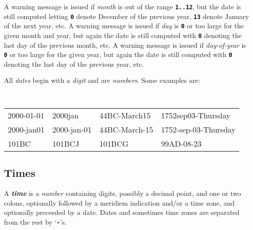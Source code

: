 \documentclass[12pt]{article}
\newcommand{\TT}[1]{{\tt \bfseries #1}}
\newcommand{\key}[1]{{\bf \em #1}\index{#1}}
\newenvironment{indpar}[1][0.3in]%
	{\begin{list}{}%
		     {\setlength{\itemsep}{0in}%
		      \setlength{\topsep}{0in}%
		      \setlength{\parsep}{1ex}%
		      \setlength{\labelwidth}{#1}%
		      \setlength{\leftmargin}{#1}%
		      \addtolength{\leftmargin}{\labelsep}}%
	 \item}%
	{\end{list}}
\begin{document}
A warning message is issued if {\em month} is out of the range
\TT{1..12}, but the date is still computed letting \TT{0} denote
December of the previous year, \TT{13} denote January of the
next year, etc.  A warning message is issued if {\em day} is
\TT{0} or too large for the given month and year, but again
the date is still computed with \TT{0} denoting the last day of
the previous month, etc.
A warning message is issued if {\em day-of-year} is
\TT{0} or too large for the given year, but again
the date is still computed with \TT{0} denoting the last day of
the previous year, etc.

All {\em dates} begin with a {\em digit} and are {\em numbers}.
Some examples are:

\begin{indpar}[0.1in]
\tt
\begin{tabular}{@{}l@{~~}l@{~~}l@{~~}l@{}}
2000-01-01	& 2000jan	 & 44BC-March15 & 1752sep03-Thursday \\
2000-jan01	& 2000-jan-01	 & 44BC-March-15 & 1752-sep-03-Thursday \\
101BC		& 101BCJ	 & 101BCG	& 99AD-08-23 \\
\end{tabular}
\end{indpar}

\subsection{Times}
\label{TIMES}

A \key{time} is a {\em number} containing digits, possibly a decimal
point, and one or two colons, optionally followed by a meridiem indication
and/or a time zone, and optionally preceeded by a date.  Dates and sometimes
time zones are separated from the rest by `\TT{-}'s.
\end{document}
